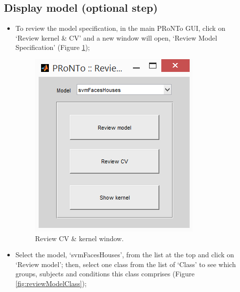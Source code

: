 
\subsection{Display model (optional step)}

\begin{itemize}
\item To review the model specification, in the main PRoNTo GUI, click on `Review kernel \& CV' and a new window will open, `Review Model Specification' (Figure \ref{fig:reviewModel});

\begin{figure}[h!]
	\centering
		\includegraphics[scale=0.7]{images/Tutorial/classification/reviewModel.png}
	\caption{Review CV \& kernel window.}
	\label{fig:reviewModel}
\end{figure}

\item Select the model, `svmFacesHouses', from the list at the top and click on `Review model'; then, select one class from the list of `Class' to see which groups, subjects and conditions this class comprises (Figure \ref{fig:reviewModelClass});




\end{itemize}
